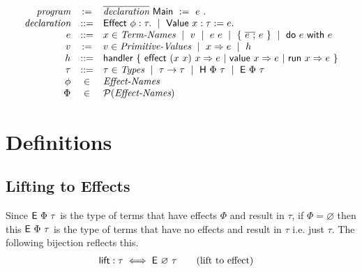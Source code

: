 \documentclass{article}
\begin{document}
\[ \begin{array}{rcl}
  \textit{program}     & :=  & \overline{\textit{declaration}} ~ \textsf{Main} ~ := ~ e ~ .
  \\
  \textit{declaration} & ::= &
  \textsf{Effect} ~ \phi:\tau. ~ \mid ~
  \textsf{Value} ~ x : \tau := e.
  \\
  e                 & ::= &
  x \in \textit{Term-Names} ~ \mid ~
  v ~ \mid ~
  e ~ e ~ \mid ~
  \{ ~ \overline{e ~ ;} ~ e ~ \} ~ \mid ~
  \textsf{do} ~ e ~ \textsf{with} ~ e
  \\
  v                 & :=  &
  v \in \textit{Primitive-Values} ~ \mid ~
  x \Rightarrow e ~ \mid ~
  h
  \\
  h                 & ::= &
  \textsf{handler} ~ \{ ~
  \textsf{effect} ~ (x ~ x) ~ x \Rightarrow e ~ | ~
  \textsf{value} ~ x \Rightarrow e ~ | ~
  \textsf{run} ~ x \Rightarrow e
  ~ \}
  \\
  \tau              & ::= &
  \tau \in \textit{Types} ~ \mid ~
  \tau \rightarrow \tau ~ \mid ~
  \textsf{H} ~ \Phi ~ \tau ~ \mid ~
  \textsf{E} ~ \Phi ~ \tau
  \\
  \phi              & \in & \textit{Effect-Names}
  \\
  \Phi              & \in & \mathcal{P}(\textit{Effect-Names})
 \end{array} \]

\section{Definitions}

\subsection{Lifting to Effects}

Since $\textsf{E} ~ \Phi ~ \tau$ is the type of terms that have effects $\Phi$ and result in $\tau$,
if $\Phi = \varnothing$ then this $\textsf{E} ~ \Phi ~ \tau$ is the type of terms that have
no effects and result in $\tau$ i.e. just $\tau$. The following bijection reflects this.
\begin{align*}
 \textsf{lift} : \tau & \iff \textsf{E} ~ \varnothing ~ \tau \tag{lift to effect}
\end{align*}
\end{document}
